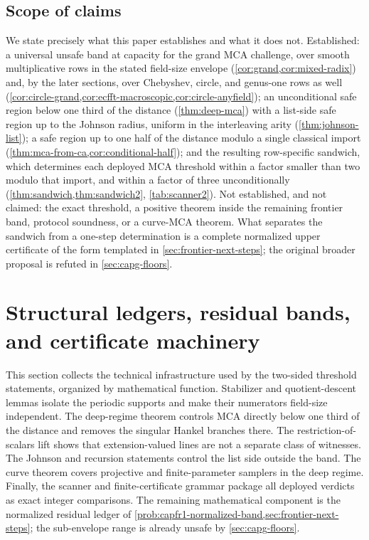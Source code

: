 \documentclass[11pt]{article}
\theoremstyle{definition}
\theoremstyle{remark}
\begin{document}
\subsection{Scope of claims}

We state precisely what this paper establishes and what it does not. Established: a universal unsafe band at capacity for the grand MCA challenge, over smooth multiplicative rows in the stated field-size envelope (\cref{cor:grand,cor:mixed-radix}) and, by the later sections, over Chebyshev, circle, and genus-one rows as well (\cref{cor:circle-grand,cor:ecfft-macroscopic,cor:circle-anyfield}); an unconditional safe region below one third of the distance (\cref{thm:deep-mca}) with a list-side safe region up to the Johnson radius, uniform in the interleaving arity (\cref{thm:johnson-list}); a safe region up to one half of the distance modulo a single classical import (\cref{thm:mca-from-ca,cor:conditional-half}); and the resulting row-specific sandwich, which determines each deployed MCA threshold within a factor smaller than two modulo that import, and within a factor of three unconditionally (\cref{thm:sandwich,thm:sandwich2}, \cref{tab:scanner2}). Not established, and not claimed: the exact threshold, a positive theorem inside the remaining frontier band, protocol soundness, or a curve-MCA theorem. What separates the sandwich from a one-step determination is a complete normalized upper certificate of the form templated in \cref{sec:frontier-next-steps}; the original broader proposal is refuted in \cref{sec:capg-floors}.

\section{Structural ledgers, residual bands, and certificate machinery}\label{sec:discharge}

This section collects the technical infrastructure used by the two-sided threshold statements, organized by mathematical function.  Stabilizer and quotient-descent lemmas isolate the periodic supports and make their numerators field-size independent.  The deep-regime theorem controls MCA directly below one third of the distance and removes the singular Hankel branches there.  The restriction-of-scalars lift shows that extension-valued lines are not a separate class of witnesses.  The Johnson and recursion statements control the list side outside the band.  The curve theorem covers projective and finite-parameter samplers in the deep regime.  Finally, the scanner and finite-certificate grammar package all deployed verdicts as exact integer comparisons.  The remaining mathematical component is the normalized residual ledger of \cref{prob:capfr1-normalized-band,sec:frontier-next-steps}; the sub-envelope range is already unsafe by \cref{sec:capg-floors}.
\end{document}
